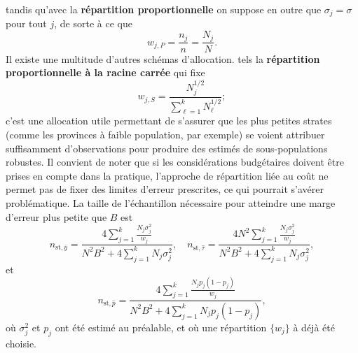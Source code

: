 tandis qu'avec la \textbf{r\'epartition proportionnelle} on suppose en outre que $\sigma_j=\sigma$ pour tout $j$, de sorte \`a ce que $$w_{j,P}=\frac{n_j}{n}=\frac{N_j}{N}.$$ Il existe une multitude d'autres schémas d'allocation. tels la \textbf{r\'epartition proportionnelle \`a la racine carr\'ee} qui fixe $$w_{j,S}=\frac{N_j^{1/2}}{\sum_{\ell=1}^kN_{\ell}^{1/2}};$$ c'est une allocation utile permettant de s'assurer que les plus petites strates (comme les provinces à faible population, par exemple) se voient attribuer suffisamment d'observations pour produire des estim\'es de sous-populations robustes.
 \newl Il convient de noter que si les considérations budgétaires doivent être prises en compte dans la pratique, l'approche de r\'epartition li\'ee au co\^ut ne permet pas de fixer des limites d'erreur prescrites, ce qui pourrait s'avérer problématique. La taille de l'échantillon nécessaire pour atteindre une marge d'erreur plus petite que $B$ est\small $$n_{\textrm{st},\overline{y}}=\frac{4\sum_{j=1}^k\frac{N_j\sigma_j^2}{w_j}}{N^2B^2+4\sum_{j=1}^kN_j\sigma_j^2},\quad n_{\textrm{st},\hat{\tau}}=\frac{4N^2\sum_{j=1}^k\frac{N_j\sigma_j^2}{w_j}}{N^2B^2+4\sum_{j=1}^kN_j\sigma_j^2},$$ et $$n_{\textrm{st},\hat{p}}=\frac{4\sum_{j=1}^k\frac{N_jp_j(1-p_j)}{w_j}}{N^2B^2+4\sum_{j=1}^kN_jp_j(1-p_j)},$$ \normalsize o\`u $\sigma_j^2$ et $p_j$ ont \'et\'e estim\'e au pr\'ealable, et o\`u une r\'epartition $\{w_j\}$ \`a d\'ej\`a \'et\'e choisie. \newpage\noindent  
